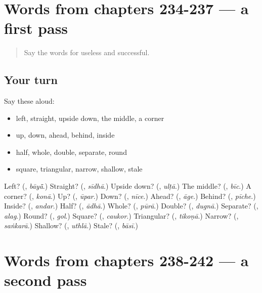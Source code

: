\section[(dialogue)]{Words from chapters 234-237 — a first pass}

\label{lesson:HI-R242-first-pass-words-from-chapters-234-237}



\begin{quote}
Say the words for useless and successful.
\end{quote}

\subsection*{Your turn}
Say these aloud:

\begin{itemize}
\raggedright
  \item left, straight, upside down, the middle, a corner
  \item up, down, ahead, behind, inside
  \item half, whole, double, separate, round
  \item square, triangular, narrow, shallow, stale
\end{itemize}

\begin{tcolorbox}[breakable,colback=teal!4,colframe=teal!35!black,title={Before you move on}]
Left? (\textbf{}, \emph{bāyā̃}.) Straight? (\textbf{}, \emph{sīdhā}.) Upside down? (\textbf{}, \emph{ulṭā}.) The middle? (\textbf{}, \emph{bīc}.) A corner? (\textbf{}, \emph{konā}.) Up? (\textbf{}, \emph{ūpar}.) Down? (\textbf{}, \emph{nīce}.) Ahead? (\textbf{}, \emph{āge}.) Behind? (\textbf{}, \emph{pīche}.) Inside? (\textbf{}, \emph{andar}.) Half? (\textbf{}, \emph{ādhā}.) Whole? (\textbf{}, \emph{pūrā}.) Double? (\textbf{}, \emph{dugnā}.) Separate? (\textbf{}, \emph{alag}.) Round? (\textbf{}, \emph{gol}.) Square? (\textbf{}, \emph{caukor}.) Triangular? (\textbf{}, \emph{tikoṇā}.) Narrow? (\textbf{}, \emph{saṅkarā}.) Shallow? (\textbf{}, \emph{uthlā}.) Stale? (\textbf{}, \emph{bāsī}.)
\end{tcolorbox}
\section[(dialogue)]{Words from chapters 238-242 — a second pass}

